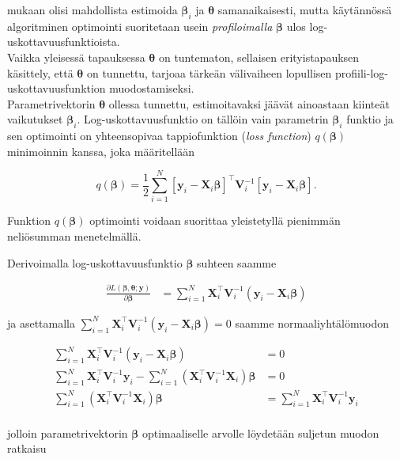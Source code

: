\documentclass[finnish]{docopts}
\begin{document}
\cite{west14} mukaan olisi mahdollista estimoida $\bm{\beta}_i$ ja $\bm{\theta}$ samanaikaisesti, mutta käytännössä algoritminen optimointi suoritetaan usein \textit{profiloimalla} $\bm{\beta}$ ulos log-uskottavuusfunktioista. \\

Vaikka yleisessä tapauksessa $\bm{\theta}$ on tuntematon, sellaisen erityistapauksen käsittely, että $\bm{\theta}$ on tunnettu, tarjoaa tärkeän välivaiheen lopullisen profiili-log-uskottavuus\-funktion muodostamiseksi.\\

Parametrivektorin $\bm{\theta}$ ollessa tunnettu, estimoitavaksi jäävät ainoastaan kiinteät vaikutukset $\bm{\beta}_i$. Log-uskottavuusfunktio on tällöin vain parametrin $\bm{\beta}_i$ funktio ja sen optimointi on yhteensopivaa tappiofunktion (\textit{loss function}) $q(\bm{\beta})$ minimoinnin kanssa, joka määritellään

$$
q(\bm{\beta}) = \frac{1}{2} \sum\limits_{i=1}^{N} [\bm{y}_i - \bm{X}_i \bm{\beta}]^\top \bm{V}_i^{-1} [\bm{y}_i - \bm{X}_i \bm{\beta}].
$$

Funktion $q(\bm{\beta})$ optimointi voidaan suorittaa yleistetyllä pienimmän neliösumman menetelmällä.

Derivoimalla log-uskottavuusfunktio $\bm{\beta}$ suhteen saamme

$$
\begin{aligned}
\frac{\partial L(\bm{\beta}, \bm{\theta};\bm{y})}{\partial \bm{\beta}} &= \sum\limits_{i=1}^{N}\bm{X}_{i}^\top \bm{V}_i^{-1} (\bm{y}_i - \bm{X}_{i} \bm{\beta})
\end{aligned}
$$

ja asettamalla $\sum\limits_{i=1}^{N}\bm{X}_{i}^\top \bm{V}_i^{-1} (\bm{y}_i - \bm{X}_{i} \bm{\beta}) = 0$ saamme normaaliyhtälömuodon

$$
\begin{aligned}
\sum\limits_{i=1}^{N}\bm{X}_{i}^\top \bm{V}_i^{-1} (\bm{y}_i - \bm{X}_{i} \bm{\beta}) &= 0 \\
\sum\limits_{i=1}^{N}\bm{X}_{i}^\top \bm{V}_i^{-1}\bm{y}_i - \sum\limits_{i=1}^{N}(\bm{X}_{i}^\top \bm{V}_i^{-1}\bm{X}_{i}) \bm{\beta} &= 0 \\
 \sum\limits_{i=1}^{N}(\bm{X}_{i}^\top \bm{V}_i^{-1}\bm{X}_{i}) \bm{\beta} &= \sum\limits_{i=1}^{N}\bm{X}_{i}^\top \bm{V}_i^{-1}\bm{y}_i \\
\end{aligned}
$$


jolloin parametrivektorin $\bm{\beta}$ optimaaliselle arvolle löydetään suljetun muodon ratkaisu
\end{document}
